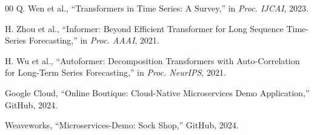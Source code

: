 \documentclass[conference]{IEEEtran}
\begin{document}
\begin{thebibliography}{00}
 Q. Wen et al., ``Transformers in Time Series: A Survey,'' in \textit{Proc. IJCAI}, 2023.

 H. Zhou et al., ``Informer: Beyond Efficient Transformer for Long Sequence Time-Series Forecasting,'' in \textit{Proc. AAAI}, 2021.

 H. Wu et al., ``Autoformer: Decomposition Transformers with Auto-Correlation for Long-Term Series Forecasting,'' in \textit{Proc. NeurIPS}, 2021.

 Google Cloud, ``Online Boutique: Cloud-Native Microservices Demo Application,'' GitHub, 2024.

 Weaveworks, ``Microservices-Demo: Sock Shop,'' GitHub, 2024.

\end{thebibliography}
\end{document}
